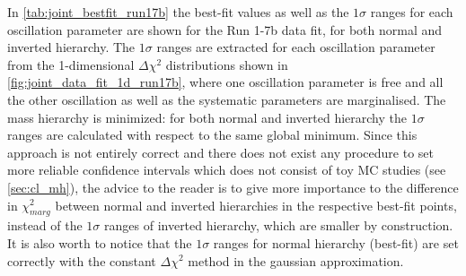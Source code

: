 %
%
%





In \cref{tab:joint_bestfit_run17b} the best-fit values as well as the $1\sigma$ ranges for each 
oscillation parameter are shown for the Run 1-7b data fit, for both normal and inverted hierarchy.
The $1\sigma$ ranges are extracted for each oscillation parameter
from the 1-dimensional $\Delta \chi^2$ distributions shown in \cref{fig:joint_data_fit_1d_run17b},
where one oscillation parameter is free and all the other oscillation as well as the systematic 
parameters are marginalised.
The mass hierarchy is minimized:
for both normal and inverted hierarchy the $1\sigma$ ranges are calculated with respect to the 
same global minimum.
Since this approach is not entirely correct and there does not exist any procedure 
to set more reliable confidence intervals which does not consist of toy MC studies (see \cref{sec:cl_mh}),
the advice to the reader is to give more importance to the difference in $\chi^2_{marg}$
between normal and inverted hierarchies in the respective best-fit points, 
instead of the $1\sigma$ ranges of inverted hierarchy, 
which are smaller by construction.
It is also worth to notice that the $1\sigma$ ranges for normal hierarchy (best-fit)
are set correctly with the constant $\Delta \chi^2$ method in the gaussian approximation.

